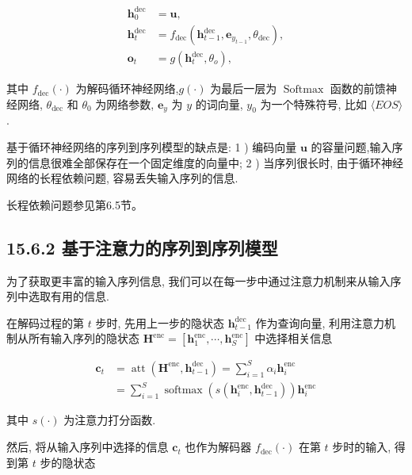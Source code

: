 \documentclass[10pt]{article}
\begin{document}
\begin{align*}
\boldsymbol{h}_{0}^{\mathrm{dec}} & =\boldsymbol{u},  \tag{15.101}\\
\boldsymbol{h}_{t}^{\mathrm{dec}} & =f_{\mathrm{dec}}\left(\boldsymbol{h}_{t-1}^{\mathrm{dec}}, \boldsymbol{e}_{y_{t-1}}, \theta_{\mathrm{dec}}\right),  \tag{15.102}\\
\boldsymbol{o}_{t} & =g\left(\boldsymbol{h}_{t}^{\mathrm{dec}}, \theta_{o}\right), \tag{15.103}
\end{align*}


其中 $f_{\mathrm{dec}}(\cdot)$ 为解码循环神经网络,$g(\cdot)$ 为最后一层为 $\operatorname{Softmax}$ 函数的前馈神经网络, $\theta_{\mathrm{dec}}$ 和 $\theta_{0}$ 为网络参数, $\boldsymbol{e}_{y}$ 为 $y$ 的词向量, $y_{0}$ 为一个特殊符号, 比如 $\langle E O S\rangle$.

基于循环神经网络的序列到序列模型的缺点是: 1 ) 编码向量 $\boldsymbol{u}$ 的容量问题,输入序列的信息很难全部保存在一个固定维度的向量中; 2 ) 当序列很长时, 由于循环神经网络的长程依赖问题, 容易丢失输入序列的信息.

长程依赖问题参见第6.5节。

\subsection*{15.6.2 基于注意力的序列到序列模型}
为了获取更丰富的输入序列信息, 我们可以在每一步中通过注意力机制来从输入序列中选取有用的信息.

在解码过程的第 $t$ 步时, 先用上一步的隐状态 $\boldsymbol{h}_{t-1}^{\mathrm{dec}}$ 作为查询向量, 利用注意力机制从所有输入序列的隐状态 $\boldsymbol{H}^{\mathrm{enc}}=\left[\boldsymbol{h}_{1}^{\mathrm{enc}}, \cdots, \boldsymbol{h}_{S}^{\mathrm{enc}}\right]$ 中选择相关信息


\begin{align*}
\boldsymbol{c}_{t} & =\operatorname{att}\left(\boldsymbol{H}^{\mathrm{enc}}, \boldsymbol{h}_{t-1}^{\mathrm{dec}}\right)=\sum_{i=1}^{S} \alpha_{i} \boldsymbol{h}_{i}^{\mathrm{enc}}  \tag{15.104}\\
& =\sum_{i=1}^{S} \operatorname{softmax}\left(s\left(\boldsymbol{h}_{i}^{\mathrm{enc}}, \boldsymbol{h}_{t-1}^{\mathrm{dec}}\right)\right) \boldsymbol{h}_{i}^{\mathrm{enc}} \tag{15.105}
\end{align*}


其中 $s(\cdot)$ 为注意力打分函数.

然后, 将从输入序列中选择的信息 $\boldsymbol{c}_{t}$ 也作为解码器 $f_{\mathrm{dec}}(\cdot)$ 在第 $t$ 步时的输入, 得到第 $t$ 步的隐状态
\end{document}

